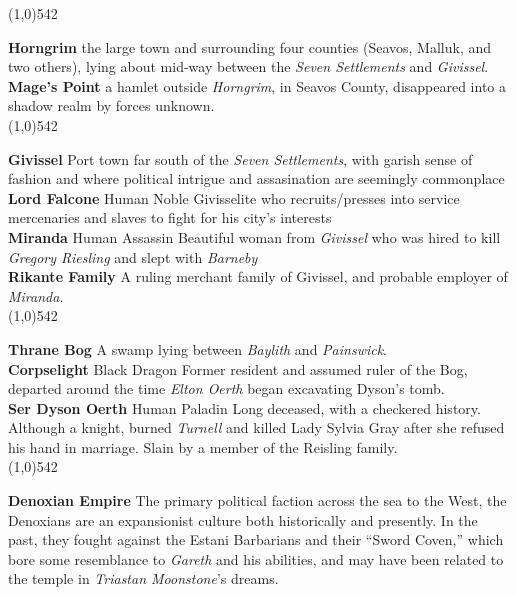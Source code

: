 \documentclass[letterpaper]{article}
\newcommand{\fullline}{\noindent\line(1,0){542} \\}
\newcommand{\person}[3]{\noindent\textbf{#1
    \ifstrequal{#2}{M}{{\color{ProcessBlue}\male}}{%
    \ifstrequal{#2}{F}{\color{VioletRed}\female}{}}}{\scriptsize #3}}
\begin{document}
\vspace{-1.75em}
\fullline
\vspace{-1.5em}

\noindent\textbf{Horngrim} the large town and surrounding four counties (Seavos, Malluk, and two others), lying about mid-way between the \emph{Seven Settlements} and \emph{Givissel}.\\
\noindent\textbf{Mage's Point} a hamlet outside \emph{Horngrim}, in Seavos County, disappeared into a shadow realm by forces unknown.\\

\vspace{-1.75em}
\fullline
\vspace{-1.5em}

\noindent\textbf{Givissel} Port town far south of the \emph{Seven Settlements}, with garish sense of fashion and where political intrigue and assasination are seemingly commonplace \\
\person{Lord Falcone}{M}{Human Noble} Givisselite who recruits/presses into service mercenaries and slaves to fight for his city's interests\\
\person{Miranda}{F}{Human Assassin} Beautiful woman from \emph{Givissel} who was hired to kill \emph{Gregory Riesling} and slept with \emph{Barneby} \\
\noindent\textbf{Rikante Family} A ruling merchant family of Givissel, and probable employer of \emph{Miranda}.\\

\vspace{-1.75em}
\fullline
\vspace{-1.5em}

\noindent\textbf{Thrane Bog} A swamp lying between \emph{Baylith} and \emph{Painswick}.\\
\person{Corpselight}{F}{Black Dragon} Former resident and assumed ruler of the Bog, departed around the time \emph{Elton Oerth} began excavating Dyson's tomb.\\
\person{Ser Dyson Oerth}{M}{Human Paladin} Long deceased, with a checkered history. Although a knight, burned \emph{Turnell} and killed Lady Sylvia Gray after she refused his hand in marriage. Slain by a member of the Reisling family.\\

\vspace{-1.75em}
\fullline
\vspace{-1.5em}

\noindent\textbf{Denoxian Empire} The primary political faction across the sea to the West, the Denoxians are an expansionist culture both historically and presently. In the past, they fought against the Estani Barbarians and their ``Sword Coven,'' which bore some resemblance to \emph{Gareth} and his abilities, and may have been related to the temple in \emph{Triastan Moonstone}'s dreams.\\
\end{document}

